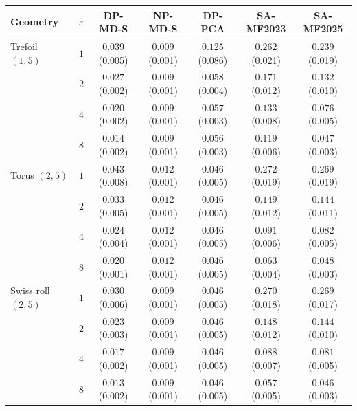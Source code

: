 \begin{tabular}{lcccccc}
\toprule
Geometry & $\varepsilon$ & DP-MD-S & NP-MD-S & DP-PCA & SA-MF2023 & SA-MF2025 \\
\midrule
Trefoil $(1,5)$ & $1$ & $0.039$ \scriptsize(0.005) & $0.009$ \scriptsize(0.001) & $0.125$ \scriptsize(0.086) & $0.262$ \scriptsize(0.021) & $0.239$ \scriptsize(0.019) \\
 & $2$ & $0.027$ \scriptsize(0.002) & $0.009$ \scriptsize(0.001) & $0.058$ \scriptsize(0.004) & $0.171$ \scriptsize(0.012) & $0.132$ \scriptsize(0.010) \\
 & $4$ & $0.020$ \scriptsize(0.002) & $0.009$ \scriptsize(0.001) & $0.057$ \scriptsize(0.003) & $0.133$ \scriptsize(0.008) & $0.076$ \scriptsize(0.005) \\
 & $8$ & $0.014$ \scriptsize(0.002) & $0.009$ \scriptsize(0.001) & $0.056$ \scriptsize(0.003) & $0.119$ \scriptsize(0.006) & $0.047$ \scriptsize(0.003) \\
\midrule
Torus $(2,5)$ & $1$ & $0.043$ \scriptsize(0.008) & $0.012$ \scriptsize(0.001) & $0.046$ \scriptsize(0.005) & $0.272$ \scriptsize(0.019) & $0.269$ \scriptsize(0.019) \\
 & $2$ & $0.033$ \scriptsize(0.005) & $0.012$ \scriptsize(0.001) & $0.046$ \scriptsize(0.005) & $0.149$ \scriptsize(0.012) & $0.144$ \scriptsize(0.011) \\
 & $4$ & $0.024$ \scriptsize(0.004) & $0.012$ \scriptsize(0.001) & $0.046$ \scriptsize(0.005) & $0.091$ \scriptsize(0.006) & $0.082$ \scriptsize(0.005) \\
 & $8$ & $0.020$ \scriptsize(0.001) & $0.012$ \scriptsize(0.001) & $0.046$ \scriptsize(0.005) & $0.063$ \scriptsize(0.004) & $0.048$ \scriptsize(0.003) \\
\midrule
Swiss roll $(2,5)$ & $1$ & $0.030$ \scriptsize(0.006) & $0.009$ \scriptsize(0.001) & $0.046$ \scriptsize(0.005) & $0.270$ \scriptsize(0.018) & $0.269$ \scriptsize(0.017) \\
 & $2$ & $0.023$ \scriptsize(0.003) & $0.009$ \scriptsize(0.001) & $0.046$ \scriptsize(0.005) & $0.148$ \scriptsize(0.012) & $0.144$ \scriptsize(0.010) \\
 & $4$ & $0.017$ \scriptsize(0.002) & $0.009$ \scriptsize(0.001) & $0.046$ \scriptsize(0.005) & $0.088$ \scriptsize(0.007) & $0.081$ \scriptsize(0.005) \\
 & $8$ & $0.013$ \scriptsize(0.002) & $0.009$ \scriptsize(0.001) & $0.046$ \scriptsize(0.005) & $0.057$ \scriptsize(0.005) & $0.046$ \scriptsize(0.003) \\

\end{tabular}
